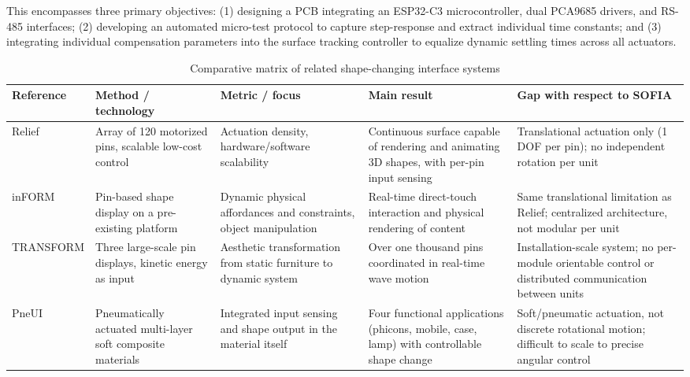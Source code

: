 \documentclass[lettersize,journal]{IEEEtran}
\begin{document}
	This encompasses three primary objectives: (1) designing a PCB integrating an ESP32-C3 microcontroller, dual PCA9685 drivers, and RS-485 interfaces; (2) developing an automated micro-test protocol to capture step-response and extract individual time constants; and (3) integrating individual compensation parameters into the surface tracking controller to equalize dynamic settling times across all actuators.
	
	\begin{table}[!t]
		\centering
		\caption{Comparative matrix of related shape-changing interface systems}
		\label{tab:related_work_matrix}
		\scriptsize
		
		\setlength{\tabcolsep}{3pt}
		\renewcommand{\arraystretch}{1.1}
		
		\begin{tabularx}{\textwidth}
			{@{}P{2.2cm} P{3cm} P{3cm} P{4cm} Y@{}}
			
			\toprule
			Reference & Method / technology & Metric / focus & Main result & Gap with respect to SOFIA \\
			\midrule
			
			Relief \cite{leithinger2010relief} &
			Array of 120 motorized pins, scalable low-cost control &
			Actuation density, hardware/software scalability &
			Continuous surface capable of rendering and animating 3D shapes, with per-pin input sensing &
			Translational actuation only (1 DOF per pin); no independent rotation per unit \\
			
			inFORM \cite{follmer2013inform} &
			Pin-based shape display on a pre-existing platform &
			Dynamic physical affordances and constraints, object manipulation &
			Real-time direct-touch interaction and physical rendering of content &
			Same translational limitation as Relief; centralized architecture, not modular per unit \\
			
			TRANSFORM \cite{ishii2015transform} &
			Three large-scale pin displays, kinetic energy as input &
			Aesthetic transformation from static furniture to dynamic system &
			Over one thousand pins coordinated in real-time wave motion &
			Installation-scale system; no per-module orientable control or distributed communication between units \\
			
			PneUI \cite{yao2013pneui} &
			Pneumatically actuated multi-layer soft composite materials &
			Integrated input sensing and shape output in the material itself &
			Four functional applications (phicons, mobile, case, lamp) with controllable shape change &
			Soft/pneumatic actuation, not discrete rotational motion; difficult to scale to precise angular control \\
			

\end{tabularx}
\end{table}
\end{document}
